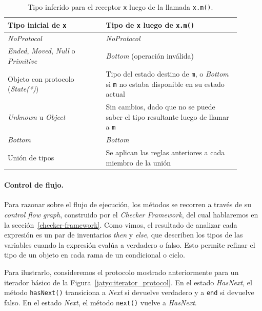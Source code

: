 \begin{table}[htbp]
    \centering
    \renewcommand{\arraystretch}{1.3}
    \begin{tabular}{|p{0.38\linewidth}|p{0.52\linewidth}|}
        \hline
        \textbf{Tipo inicial de \texttt{x}} & \textbf{Tipo de \texttt{x} luego de \texttt{x.m()}} \\
        \hline
        \textit{NoProtocol} & \textit{NoProtocol} \\
        \hline
        \textit{Ended}, \textit{Moved}, \textit{Null} o \textit{Primitive} & \textit{Bottom} (operación inválida) \\
        \hline
        Objeto con protocolo (\textit{State(*)}) & Tipo del estado destino de \texttt{m}, o \textit{Bottom} si \texttt{m} no estaba disponible en su estado actual \\
        \hline
        \textit{Unknown} u \textit{Object} & Sin cambios, dado que no se puede saber el tipo resultante luego de llamar a \texttt{m} \\
        \hline
        \textit{Bottom} & \textit{Bottom} \\
        \hline
        Unión de tipos & Se aplican las reglas anteriores a cada miembro de la unión \\
        \hline
    \end{tabular}
    \caption{Tipo inferido para el receptor \texttt{x} luego de la llamada \texttt{x.m()}.}
    \label{tab:llamada-metodo}
\end{table}

\paragraph{Control de flujo.}
Para razonar sobre el flujo de ejecución, los métodos se recorren a través de su \textit{control flow graph}, construido por el \textit{Checker Framework}, del cual hablaremos en la sección~\ref{checker-framework}. Como vimos, el resultado de analizar cada expresión es un par de inventarios \textit{then} y \textit{else}, que describen los tipos de las variables cuando la expresión evalúa a verdadero o falso. Esto permite refinar el tipo de un objeto en cada rama de un condicional o ciclo.

Para ilustrarlo, consideremos el protocolo mostrado anteriormente para un iterador básico de la Figura~\ref{jatyc:iterator_protocol}. En el estado \textit{HasNext}, el método \texttt{hasNext()} transiciona a \textit{Next} si devuelve verdadero y a \texttt{end} si devuelve falso. En el estado \textit{Next}, el método \texttt{next()} vuelve a \textit{HasNext}.

